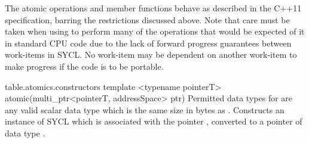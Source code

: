 

The atomic operations and member functions behave as described in the C++11
specification, barring the restrictions discussed above. Note that care
must be taken when using  to
perform many of the operations that would be expected of it in
standard CPU code due to the lack of forward progress guarantees
between work-items in SYCL. No work-item may be dependent on another
work-item to make progress if the code is to be portable.

{table.atomics.constructors}
  \addRowTwoSL
    { template <typename pointerT> }
    { atomic(multi_ptr<pointerT, addressSpace> ptr) }
    {
      Permitted data types for  are any valid scalar data
      type which is the same size in bytes as . Constructs an
      instance of SYCL  which is associated with the pointer
      , converted to a pointer of data type .
    }
\completeInfoTable

